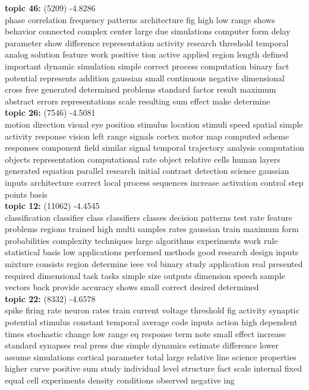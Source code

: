 \documentclass{article}
\begin{document}
\begin{spacing}{1.1}
\begin{table}[ht]
\begin{minipage}[b]{0.5\linewidth}
\begin{center}
{\bf topic 46:} (5209) -4.8286\\
phase correlation frequency patterns architecture fig high low range shows behavior connected complex center large due simulations computer form delay parameter show difference representation activity research threshold temporal analog solution feature work positive tion active applied region length defined important dynamic simulation simple correct process computation binary fact potential represents addition gaussian small continuous negative dimensional cross free generated determined problems standard factor result maximum abstract errors representations scale resulting sum effect make determine \\
{\bf topic 26:} (7546) -4.5081\\
motion direction visual eye position stimulus location stimuli speed spatial simple activity response vision left range signals cortex motor map computed scheme responses component field similar signal temporal trajectory analysis computation objects representation computational rate object relative cells human layers generated equation parallel research initial contrast detection science gaussian inputs architecture correct local process sequences increase activation control step points basis \\
{\bf topic 12:} (11062) -4.4545\\
classification classifier class classifiers classes decision patterns test rate feature problems regions trained high multi samples rates gaussian train maximum form probabilities complexity techniques large algorithms experiments work rule statistical basis low applications performed methods good research design inputs mixture consists region determine ieee vol binary study application real presented required dimensional task tasks simple size outputs dimension speech sample vectors back provide accuracy shows small correct desired determined \\
{\bf topic 22:} (8332) -4.6578\\
spike firing rate neuron rates train current voltage threshold fig activity synaptic potential stimulus constant temporal average code inputs action high dependent times stochastic change low range eq response term note small effect increase standard synapses real press due simple dynamics estimate difference lower assume simulations cortical parameter total large relative line science properties higher curve positive sum study individual level structure fact scale internal fixed equal cell experiments density conditions observed negative ing \\
\end{center}
\end{minipage}
\end{table}


\end{spacing}
\end{document}
